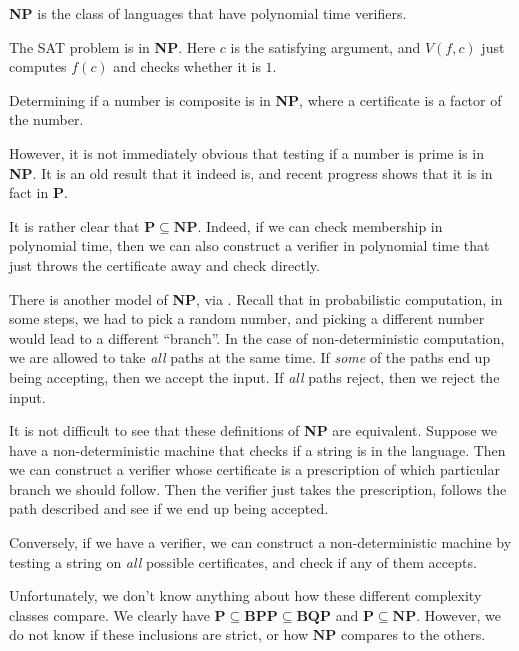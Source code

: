 \documentclass[a4paper]{article}
\begin{document}
\begin{defi}
  \textbf{NP} is the class of languages that have polynomial time verifiers.
\end{defi}

\begin{eg}
  The SAT problem is in \textbf{NP}. Here $c$ is the satisfying argument, and $V(f, c)$ just computes $f(c)$ and checks whether it is $1$.
\end{eg}

\begin{eg}
  Determining if a number is composite is in \textbf{NP}, where a certificate is a factor of the number.
\end{eg}
However, it is not immediately obvious that testing if a number is prime is in \textbf{NP}. It is an old result that it indeed is, and recent progress shows that it is in fact in \textbf{P}.

It is rather clear that $\mathbf{P} \subseteq \mathbf{NP}$. Indeed, if we can check membership in polynomial time, then we can also construct a verifier in polynomial time that just throws the certificate away and check directly.

There is another model of \textbf{NP}, via . Recall that in probabilistic computation, in some steps, we had to pick a random number, and picking a different number would lead to a different ``branch''. In the case of non-deterministic computation, we are allowed to take \emph{all} paths at the same time. If \emph{some} of the paths end up being accepting, then we accept the input. If \emph{all} paths reject, then we reject the input.

It is not difficult to see that these definitions of \textbf{NP} are equivalent. Suppose we have a non-deterministic machine that checks if a string is in the language. Then we can construct a verifier whose certificate is a prescription of which particular branch we should follow. Then the verifier just takes the prescription, follows the path described and see if we end up being accepted.

Conversely, if we have a verifier, we can construct a non-deterministic machine by testing a string on \emph{all} possible certificates, and check if any of them accepts.

Unfortunately, we don't know anything about how these different complexity classes compare. We clearly have $\mathbf{P} \subseteq \mathbf{BPP} \subseteq \mathbf{BQP}$ and $\mathbf{P} \subseteq \mathbf{NP}$. However, we do not know if these inclusions are strict, or how $\mathbf{NP}$ compares to the others.
\end{document}
